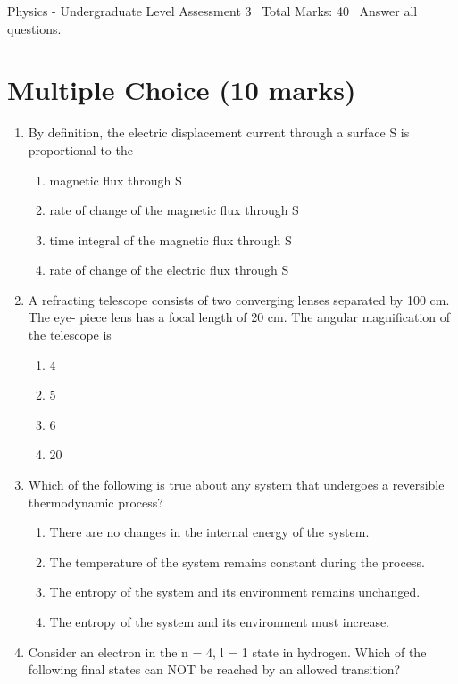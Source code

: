 \documentclass[12pt]{article}
\begin{document}
\begin{center}
Physics - Undergraduate Level Assessment 3 \
Total Marks: 40 \
Answer all questions.
\end{center}

\section*{Multiple Choice (10 marks)}
\begin{enumerate}[label=\arabic*.]
\item By definition, the electric displacement current through a surface S is proportional to the
\begin{enumerate}[label=(\alph*)]
    \item magnetic flux through S
    \item rate of change of the magnetic flux through S
    \item time integral of the magnetic flux through S
    \item rate of change of the electric flux through S
\end{enumerate}
\item A refracting telescope consists of two converging lenses separated by 100 cm. The eye- piece lens has a focal length of 20 cm. The angular magnification of the telescope is
\begin{enumerate}[label=(\alph*)]
    \item 4
    \item 5
    \item 6
    \item 20
\end{enumerate}
\item Which of the following is true about any system that undergoes a reversible thermodynamic process?
\begin{enumerate}[label=(\alph*)]
    \item There are no changes in the internal energy of the system.
    \item The temperature of the system remains constant during the process.
    \item The entropy of the system and its environment remains unchanged.
    \item The entropy of the system and its environment must increase.
\end{enumerate}
\item Consider an electron in the n = 4, l = 1 state in hydrogen. Which of the following final states can NOT be reached by an allowed transition?

\end{enumerate}
\end{document}
